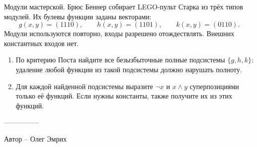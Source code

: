 \question
Модули мастерской. Брюс Беннер собирает LEGO-пульт Старка из трёх типов модулей. Их булевы функции заданы векторами:
\[
g(x,y)=(1110),\qquad h(x,y)=(1101),\qquad k(x,y)=(0110).
\]
Модули используются повторно, входы разрешено отождествлять. Внешних константных входов нет.
\begin{enumerate}
\item По критерию Поста найдите все безызбыточные полные подсистемы $\{g,h,k\}$: удаление любой функции из такой подсистемы должно нарушать полноту.
\item Для каждой найденной подсистемы выразите $\neg x$ и $x\land y$ суперпозициями только её функций. Если нужны константы, также получите их из этих функций.
\end{enumerate}

---------------

Автор -- Олег Эмрих
